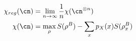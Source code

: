 \begin{align}
	\chi_{reg}(\cn) &= \lim_{n \to \infty} \frac{1}{n} \chi(\cn^{\otimes n}) \\
	\chi(\cn) 		&= \max_\rho S(\rho^B) - \sum_x p_X(x) S(\rho_x^B)
\end{align}

